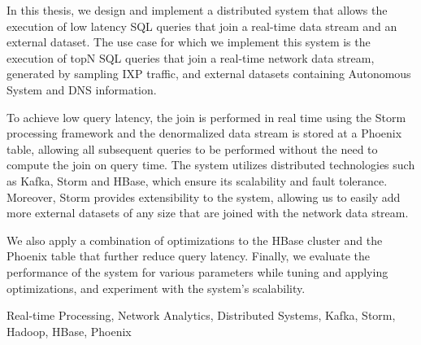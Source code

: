 \begin{abstracten}

In this thesis, we design and implement a distributed system that allows the execution of low latency SQL queries that join a real-time data stream and an external dataset. The use case for which we implement this system is the execution of topN SQL queries that join a real-time network data stream, generated by sampling IXP traffic, and external datasets containing Autonomous System and DNS information. 

To achieve low query latency, the join is performed in real time using the Storm processing framework and the denormalized data stream is stored at a Phoenix table, allowing all subsequent queries to be performed without the need to compute the join on query time. The system utilizes distributed technologies such as Kafka, Storm and HBase, which ensure its scalability and fault tolerance. Moreover, Storm provides extensibility to the system, allowing us to easily add more external datasets of any size that are joined with the network data stream.

We also apply a combination of optimizations to the HBase cluster and the Phoenix table that further reduce query latency. Finally, we evaluate the performance of the system for various parameters while tuning and applying optimizations, and experiment with the system's scalability.

\begin{keywordsen}
Real-time Processing, Network Analytics, Distributed Systems, Kafka, Storm, Hadoop, HBase, Phoe\-nix
\end{keywordsen}
\end{abstracten}
